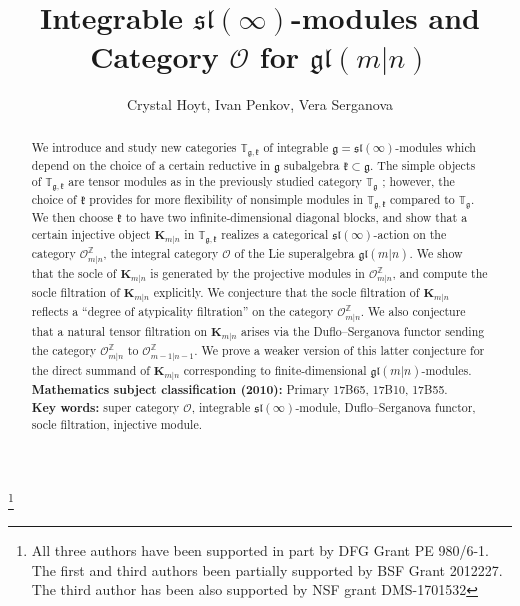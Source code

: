 \documentclass[12pt,oneside,english]{amsart}
\numberwithin{equation}{section}
\numberwithin{figure}{section}
\theoremstyle{plain}
\theoremstyle{plain}
\theoremstyle{remark}
\theoremstyle{definition}
\theoremstyle{plain}
\theoremstyle{remark}
\theoremstyle{definition}
\theoremstyle{plain}
\theoremstyle{plain}
\theoremstyle{definition}
\newcommand{\bK}{\mathbf{K}}
\newcommand{\fg}{\mathfrak{g}}
\newcommand{\fk}{\mathfrak{k}}
\begin{document}
\title{Integrable $\mathfrak{sl}(\infty)$-modules and Category $\mathcal O$ for $\mathfrak{gl}(m|n)$}


\author{Crystal Hoyt, Ivan Penkov, Vera Serganova}
\thanks{All three authors have been supported in part by DFG Grant PE 980/6-1. The first and third authors been partially supported by BSF Grant 2012227.  The third author has been also supported by NSF grant DMS-1701532}









\begin{abstract} We introduce and study new categories $\mathbb T_{\fg,\fk}$ of integrable $\fg=\mathfrak{sl}(\infty)$-modules which depend on the choice of a certain reductive in $\fg$ subalgebra $\fk\subset\fg$. The simple objects of $\mathbb T_{\fg,\fk}$ are tensor modules as in the previously studied category  $\mathbb T_{\fg}$ \cite{DPS}; however, the choice of $\fk$ provides for more flexibility of nonsimple modules in $\mathbb T_{\fg,\fk}$ compared to  $\mathbb T_{\fg}$. We then choose $\fk$ to have two infinite-dimensional diagonal blocks, and show that a certain injective object $\bK_{m|n}$ in $\mathbb T_{\fg,\fk}$ realizes a categorical $\mathfrak{sl}(\infty)$-action on the category $\mathcal{O}_{m|n}^{\mathbb{Z}}$, the integral category $\mathcal O$ of the Lie superalgebra $\mathfrak{gl}(m|n)$. We show that the socle of $\bK_{m|n}$ is generated by the projective modules in $\mathcal{O}_{m|n}^{\mathbb{Z}}$, and compute the socle filtration of $\bK_{m|n}$ explicitly. We conjecture that the socle filtration of $\bK_{m|n}$ reflects a ``degree of atypicality filtration'' on the category $\mathcal{O}_{m|n}^{\mathbb{Z}}$. We also conjecture that a natural tensor filtration on $\bK_{m|n}$ arises via the Duflo--Serganova functor sending the category $\mathcal{O}_{m|n}^{\mathbb{Z}}$ to $\mathcal{O}_{m-1|n-1}^{\mathbb{Z}}$. We prove a weaker version of this latter conjecture for the direct summand of  $\bK_{m|n}$ corresponding to finite-dimensional $\mathfrak{gl}(m|n)$-modules.\\

\noindent\textbf{Mathematics subject classification (2010):} Primary 17B65, 17B10, 17B55.\\
\noindent\textbf{Key words:} super category $\mathcal O$, integrable $\mathfrak{sl}(\infty)$-module, Duflo--Serganova functor, socle filtration, injective module.
\end{abstract}
\end{document}

